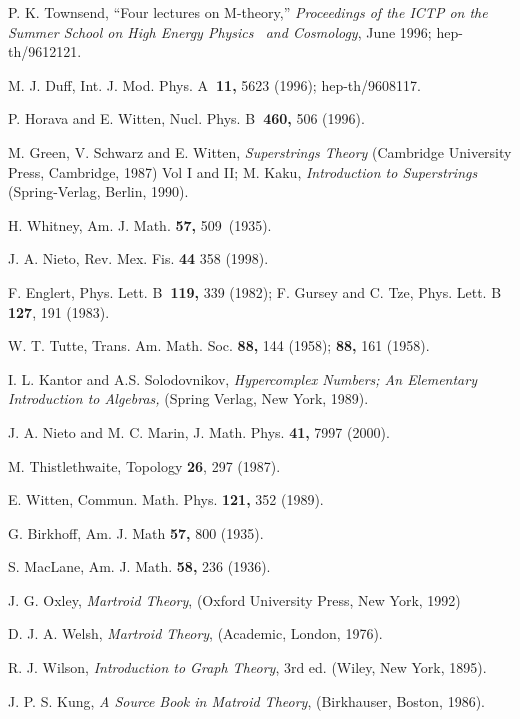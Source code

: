 \documentclass[a4paper,12pt]{article}
\begin{document}
\begin{thebibliography}{99}
  P. K. Townsend, ``Four lectures on M-theory,'' \textit{%
Proceedings of the ICTP on the Summer School on High Energy Physics \ and
Cosmology}, June 1996; hep-th/9612121.

  M. J. Duff, Int. J. Mod. Phys. A\textbf{\ 11,} 5623 (1996);
hep-th/9608117.

  P. Horava and E. Witten, Nucl. Phys. B\textbf{\ 460,} 506
(1996).

  M. Green, V. Schwarz and E. Witten, \textit{Superstrings Theory}
(Cambridge University Press, Cambridge, 1987) Vol I and II; M. Kaku, \textit{%
Introduction to Superstrings} (Spring-Verlag, Berlin, 1990).

  H. Whitney, Am. J. Math. \textbf{57,} 509\ (1935).

  J. A. Nieto, Rev. Mex. Fis. \textbf{44} 358 (1998).

  F. Englert, Phys. Lett. B\textbf{\ 119,} 339 (1982); F. Gursey
and C. Tze, Phys. Lett. B \textbf{127}, 191 (1983).

  W. T. Tutte, Trans. Am. Math. Soc. \textbf{88,} 144 (1958); 
\textbf{88,} 161 (1958).

  I. L. Kantor and A.S. Solodovnikov, \textit{Hypercomplex
Numbers; An Elementary Introduction to Algebras,} (Spring Verlag, New York,
1989).

  J. A. Nieto and M. C. Marin, J. Math. Phys. \textbf{41,} 7997
(2000).

  M. Thistlethwaite, Topology \textbf{26}, 297 (1987).

  E. Witten, Commun. Math. Phys. \textbf{121,} 352 (1989).

  G. Birkhoff, Am. J. Math \textbf{57,} 800 (1935).

  S. MacLane, Am. J. Math. \textbf{58,} 236 (1936).

  J. G. Oxley, \textit{Martroid Theory}, (Oxford University
Press, New York, 1992)

  D. J. A. Welsh, \textit{Martroid Theory}, (Academic, London,
1976).

  R. J. Wilson, \textit{Introduction to Graph Theory}, 3rd ed.
(Wiley, New York, 1895).

  J. P. S. Kung, \textit{A Source Book in Matroid Theory},
(Birkhauser, Boston, 1986).


\end{thebibliography}
\end{document}
